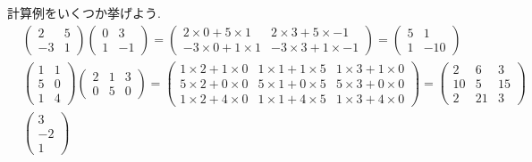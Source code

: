         計算例をいくつか挙げよう.
        \begin{align*}
            &\begin{pmatrix}
                2  & 5 \\
                -3 & 1
            \end{pmatrix}
            \begin{pmatrix}
                0 &  3 \\
                1 & -1
            \end{pmatrix}=\begin{pmatrix}
                2\times 0 +5\times 1 & 2\times 3 + 5\times -1\\
                -3\times 0 + 1\times 1 & -3\times 3+1\times -1
            \end{pmatrix}
            =\begin{pmatrix}
                5 & 1\\
                1 & -10
            \end{pmatrix}\\
            &\begin{pmatrix}
                1 & 1 \\
                5 & 0 \\
                1 & 4
            \end{pmatrix}
            \begin{pmatrix}
                2 & 1 & 3 \\
                0 & 5 & 0
            \end{pmatrix}=\begin{pmatrix}
                1\times 2 +1\times 0 & 1\times 1 + 1\times 5 & 1\times 3 + 1\times 0\\
                5\times 2 + 0\times 0 & 5\times 1+0\times 5 & 5\times 3 + 0\times 0\\
                1\times 2 + 4\times 0 & 1\times 1+4\times 5 & 1\times 3 + 4\times 0
            \end{pmatrix}
            =\begin{pmatrix}
                2 & 6 & 3\\
                10 & 5 & 15\\
                2 & 21 & 3
            \end{pmatrix}\\
            &\begin{pmatrix}
                3 \\ -2 \\ 1
            \end{pmatrix}

\end{align*}
